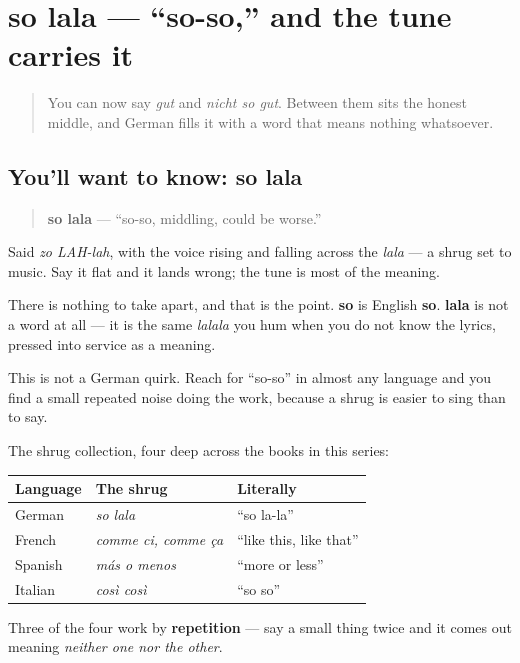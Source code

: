 \section[so lala]{so lala — \textquotedblleft{}so-so,\textquotedblright{} and the tune carries it}

\label{lesson:GE-C03-so-lala}



\begin{quote}
You can now say \emph{gut} and \emph{nicht so gut}. Between them sits the honest middle, and German fills it with a word that means nothing whatsoever.
\end{quote}

\subsection*{You'll want to know: so lala}
\begin{quote}
\textbf{so lala} — \textquotedblleft{}so-so, middling, could be worse.\textquotedblright{}
\end{quote}

Said \emph{zo LAH-lah}, with the voice rising and falling across the \emph{lala} — a shrug set to music. Say it flat and it lands wrong; the tune is most of the meaning.

\begin{cousinweb}
There is nothing to take apart, and that is the point. \textbf{so} is English \textbf{so}. \textbf{lala} is not a word at all — it is the same \emph{lalala} you hum when you do not know the lyrics, pressed into service as a meaning.

This is not a German quirk. Reach for \textquotedblleft{}so-so\textquotedblright{} in almost any language and you find a small repeated noise doing the work, because a shrug is easier to sing than to say.
\end{cousinweb}

\begin{culture}
The shrug collection, four deep across the books in this series:

\noindent
\begin{tabularx}{\linewidth}{@{}>{\raggedright\arraybackslash}X>{\raggedright\arraybackslash}X>{\raggedright\arraybackslash}X@{}}
\toprule
\textbf{Language} & \textbf{The shrug} & \textbf{Literally} \\
\midrule
German & \emph{so lala} & \textquotedblleft{}so la-la\textquotedblright{} \\
French & \emph{comme ci, comme ça} & \textquotedblleft{}like this, like that\textquotedblright{} \\
Spanish & \emph{más o menos} & \textquotedblleft{}more or less\textquotedblright{} \\
Italian & \emph{così così} & \textquotedblleft{}so so\textquotedblright{} \\
\bottomrule
\end{tabularx}

Three of the four work by \textbf{repetition} — say a small thing twice and it comes out meaning \emph{neither one nor the other}.
\end{culture}

